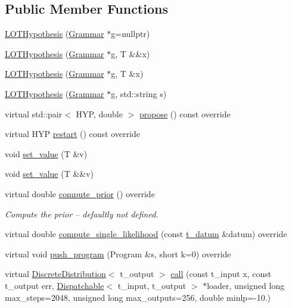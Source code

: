 \subsection*{Public Member Functions}
\begin{DoxyCompactItemize}
\item 
\hyperlink{class_l_o_t_hypothesis_a47dcb988a9cb4bba00263851d697fc12}{L\+O\+T\+Hypothesis} (\hyperlink{class_grammar}{Grammar} $\ast$g=nullptr)
\item 
\hyperlink{class_l_o_t_hypothesis_abfb19603c9bdda8b8b8c682b6cdc6e03}{L\+O\+T\+Hypothesis} (\hyperlink{class_grammar}{Grammar} $\ast$g, T \&\&x)
\item 
\hyperlink{class_l_o_t_hypothesis_a3123d5e4e140ca24fdaa568bd2b17644}{L\+O\+T\+Hypothesis} (\hyperlink{class_grammar}{Grammar} $\ast$g, T \&x)
\item 
\hyperlink{class_l_o_t_hypothesis_a09216df69fea175ccb5ffc1a947b8287}{L\+O\+T\+Hypothesis} (\hyperlink{class_grammar}{Grammar} $\ast$g, std\+::string s)
\item 
virtual std\+::pair$<$ H\+YP, double $>$ \hyperlink{class_l_o_t_hypothesis_a5ae913b145b15308d5817c6e7b1da14d}{propose} () const override
\item 
virtual H\+YP \hyperlink{class_l_o_t_hypothesis_aec55db1efe43a1ce4bb4a2daacd0f1b7}{restart} () const override
\item 
void \hyperlink{class_l_o_t_hypothesis_a873355cca03609ac0ab405d29314e591}{set\+\_\+value} (T \&v)
\item 
void \hyperlink{class_l_o_t_hypothesis_ac07e0957d2e586f2cc84821795d5c462}{set\+\_\+value} (T \&\&v)
\item 
virtual double \hyperlink{class_l_o_t_hypothesis_a80eea871bc115e4ef585f75f06857b39}{compute\+\_\+prior} () override
\begin{DoxyCompactList}\small\item\em Compute the prior -- defaultly not defined. \end{DoxyCompactList}\item 
virtual double \hyperlink{class_l_o_t_hypothesis_a835f1aafdd4bc4748c343edb80517956}{compute\+\_\+single\+\_\+likelihood} (const \hyperlink{class_l_o_t_hypothesis_a26d0ecfa6a367f32276d36cd01c0cead}{t\+\_\+datum} \&datum) override
\item 
virtual void \hyperlink{class_l_o_t_hypothesis_aff3a378ab1137e2b46f225a028343a1c}{push\+\_\+program} (Program \&s, short k=0) override
\item 
virtual \hyperlink{class_discrete_distribution}{Discrete\+Distribution}$<$ t\+\_\+output $>$ \hyperlink{class_l_o_t_hypothesis_a592d67c976a67982251239b415e0a861}{call} (const t\+\_\+input x, const t\+\_\+output err, \hyperlink{class_dispatchable}{Dispatchable}$<$ t\+\_\+input, t\+\_\+output $>$ $\ast$loader, unsigned long max\+\_\+steps=2048, unsigned long max\+\_\+outputs=256, double minlp=-\/10.)

\end{DoxyCompactItemize}
